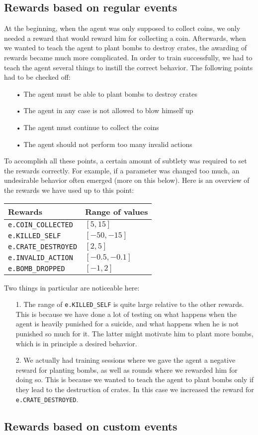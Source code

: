 \subsection{Rewards based on regular events}
At the beginning, when the agent was only supposed to collect coins, we only needed a reward that would reward him for collecting a coin. Afterwards, when we wanted to teach the agent to plant bombs to destroy crates, the awarding of rewards became much more complicated. In order to train successfully, we had to teach the agent several things to instill the correct behavior. The following points had to be checked off:
\begin{itemize}
\item[•] The agent must be able to plant bombs to destroy crates
\item[•] The agent in any case is not allowed to blow himself up
\item[•] The agent must continue to collect the coins
\item[•] The agent should not perform too many invalid actions
\end{itemize}
To accomplish all these points, a certain amount of subtlety was required to set the rewards correctly. For example, if a parameter was changed too much, an undesirable behavior often emerged (more on this below). Here is an overview of the rewards we have used up to this point:
\begin{table}[h!]
\centering
\begin{tabular}{|| l | l||} 
 \hline
 Rewards &  Range of values\\ [0.5ex] 
 \hline\hline
  \texttt{e.COIN\_COLLECTED} & $[5, 15]$ \\ [0.5ex] 
  \texttt{e.KILLED\_SELF} & $[-50 , -15]$ \\[0.5ex] 
  \texttt{e.CRATE\_DESTROYED} & $[2, 5]$ \\[0.5ex] 
  \texttt{e.INVALID\_ACTION} & $[-0.5,-0.1]$  \\[0.5ex] 
  \texttt{e.BOMB\_DROPPED} & $[-1, 2]$   \\ [1ex] 
 \hline
\end{tabular}
\end{table}
Two things in particular are noticeable here: 
\begin{itemize}
\item[1.] The range of \texttt{e.KILLED\_SELF} is quite large relative to the other rewards. This is because we have done a lot of testing on what happens when the agent is heavily punished for a suicide, and what happens when he is not punished so much for it. The latter might motivate him to plant more bombs, which is in principle a desired behavior.
\item[2.] We actually had training sessions where we gave the agent a negative reward for planting bombs, as well as rounds where we rewarded him for doing so. This is because we wanted to teach the agent to plant bombs only if they lead to the destruction of crates. In this case we increased the reward for \texttt{e.CRATE\_DESTROYED}.
\end{itemize}

\subsection{Rewards based on custom events}









